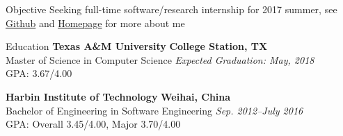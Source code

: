 \documentclass{resume} %
\begin{document}
\begin{rSection}{Objective}
Seeking full-time software/research internship for 2017 summer, see \href{https://github.com/vincenttsang}{Github} and \href{https://parasol.tamu.edu/~yzeng/}{Homepage} for more about me
\end{rSection}

\begin{rSection}{Education}
{\bf Texas A\&M University} \hfill {\bf College Station, TX} 
\\ Master of Science in Computer Science \hfill {\em Expected Graduation: May, 2018}
\\ GPA: 3.67/4.00
\vspace*{-0.2em}

{\bf Harbin Institute of Technology} \hfill {\bf Weihai, China} 
\\ Bachelor of Engineering in Software Engineering \hfill {\em Sep. 2012--July 2016}
\\ GPA: Overall 3.45/4.00, Major 3.70/4.00



\end{rSection}



\end{document}
